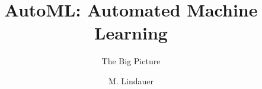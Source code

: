 


\title[AutoML]{AutoML: Automated Machine Learning}
\subtitle{The Big Picture}
\author{M. Lindauer}
\date{}





	
	\maketitle
	


